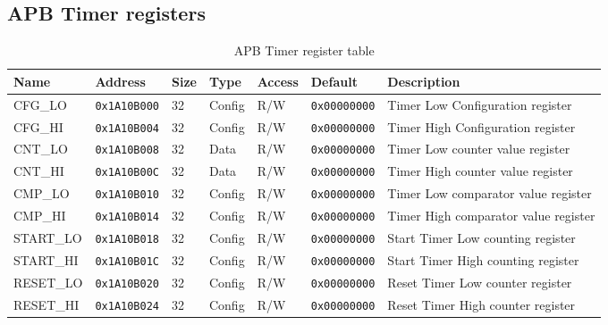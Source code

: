 \subsection{APB Timer registers}
\begin{table}[htbp]
  \small
\begin{tabularx}{\textwidth}{|l|l|l|l|l|l|X|}
  \hline
  \textbf{Name} & \textbf{Address}  & \textbf{Size} & \textbf{Type} & \textbf{Access} & \textbf{Default} & \textbf{Description} \\
  \hline
  CFG\_LO   & \texttt{0x1A10B000} & 32 & Config & R/W & \texttt{0x00000000} & Timer Low Configuration register \\
  \hline
  CFG\_HI   & \texttt{0x1A10B004}  & 32 & Config & R/W & \texttt{0x00000000} & Timer High Configuration register\\
  \hline
  CNT\_LO   & \texttt{0x1A10B008}  & 32 & Data & R/W &   \texttt{0x00000000}  & Timer Low counter value register\\
  \hline
  CNT\_HI   & \texttt{0x1A10B00C}  & 32 & Data & R/W &   \texttt{0x00000000} & Timer High counter value register\\
  \hline
  CMP\_LO   & \texttt{0x1A10B010}  & 32 & Config & R/W & \texttt{0x00000000}  & Timer Low comparator value register\\
  \hline
  CMP\_HI   & \texttt{0x1A10B014}  & 32 & Config & R/W & \texttt{0x00000000} & Timer High comparator value register\\
  \hline
  START\_LO & \texttt{0x1A10B018}  & 32 & Config & R/W & \texttt{0x00000000} & Start Timer Low counting register\\
  \hline
  START\_HI & \texttt{0x1A10B01C}  & 32 & Config & R/W & \texttt{0x00000000} & Start Timer High counting register\\
  \hline
  RESET\_LO & \texttt{0x1A10B020}  & 32 & Config & R/W & \texttt{0x00000000} & Reset Timer Low counter register\\
  \hline
  RESET\_HI & \texttt{0x1A10B024}  & 32 & Config & R/W & \texttt{0x00000000} & Reset Timer High counter register\\
  \hline

\end{tabularx}
\caption{APB Timer register table\label{tab:apb_timer}}
\end{table}

